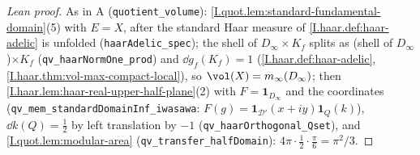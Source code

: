 \begin{proof}[Lean proof]
As in A (\texttt{quotient\_volume}): \cref{I.quot.lem:standard-fundamental-domain}(5) with $E=X$, after the standard Haar measure of \cref{I.haar.def:haar-adelic} is unfolded (\texttt{haarAdelic\_spec}); the shell of $D_\infty\times K_f$ splits as (shell of $D_\infty$)$\times K_f$ (\texttt{qv\_haarNormOne\_prod}) and $\dd g_f(K_f)=1$ (\cref{I.haar.def:haar-adelic}, \cref{I.haar.thm:vol-max-compact-local}), so $\vol(X)=m_\infty(D_\infty)$; then \cref{I.haar.lem:haar-real-upper-half-plane}(2) with $F=\mathbf 1_{D_\infty}$ and the coordinates (\texttt{qv\_mem\_standardDomainInf\_iwasawa}: $F(g)=\mathbf 1_{\mathcal D'}(x+iy)\mathbf 1_Q(k)$), $\dd k(Q)=\frac12$ by left translation by $-1$ (\texttt{qv\_haarOrthogonal\_Qset}), and \cref{I.quot.lem:modular-area} (\texttt{qv\_transfer\_halfDomain}): $4\pi\cdot\frac12\cdot\frac\pi6=\pi^2/3$.
\end{proof}
